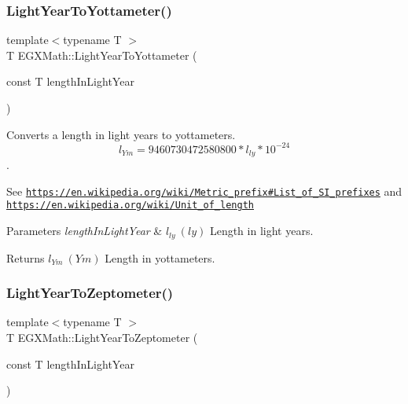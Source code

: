 \subsubsection{\texorpdfstring{Light\+Year\+To\+Yottameter()}{LightYearToYottameter()}}
{\footnotesize\ttfamily template$<$typename T $>$ \\
T E\+G\+X\+Math\+::\+Light\+Year\+To\+Yottameter (\begin{DoxyParamCaption}\item[{const T}]{length\+In\+Light\+Year }\end{DoxyParamCaption})}



Converts a length in light years to yottameters. \[ l_{Ym}=9460730472580800 * l_{ly} * 10^{-24} \]. 

See \href{https://en.wikipedia.org/wiki/Metric_prefix#List_of_SI_prefixes}{\tt https\+://en.\+wikipedia.\+org/wiki/\+Metric\+\_\+prefix\#\+List\+\_\+of\+\_\+\+S\+I\+\_\+prefixes} and \href{https://en.wikipedia.org/wiki/Unit_of_length}{\tt https\+://en.\+wikipedia.\+org/wiki/\+Unit\+\_\+of\+\_\+length} 
\begin{DoxyParams}{Parameters}
{\em length\+In\+Light\+Year} & $ l_{ly}\ (ly)$ Length in light years. \\
\hline
\end{DoxyParams}
\begin{DoxyReturn}{Returns}
$ l_{Ym}\ (Ym)$ Length in yottameters. 
\end{DoxyReturn}
\mbox{\label{group___e_g_x_math-_conversions-_length_conversions-_astronomical-_light_year-_s_i_ga9edab3e87135a70649bc16d6118f5614}} 
\subsubsection{\texorpdfstring{Light\+Year\+To\+Zeptometer()}{LightYearToZeptometer()}}
{\footnotesize\ttfamily template$<$typename T $>$ \\
T E\+G\+X\+Math\+::\+Light\+Year\+To\+Zeptometer (\begin{DoxyParamCaption}\item[{const T}]{length\+In\+Light\+Year }\end{DoxyParamCaption})}



